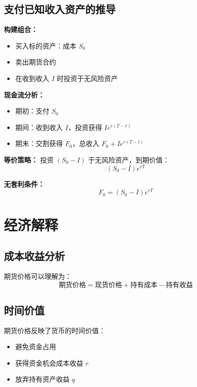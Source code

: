 \subsection{支付已知收入资产的推导}

\textbf{构建组合：}
\begin{itemize}
\item 买入标的资产：成本 $S_0$
\item 卖出期货合约
\item 在收到收入 $I$ 时投资于无风险资产
\end{itemize}

\textbf{现金流分析：}
\begin{itemize}
\item 期初：支付 $S_0$
\item 期间：收到收入 $I$，投资获得 $Ie^{r(T-t)}$
\item 期末：交割获得 $F_0$，总收入 $F_0 + Ie^{r(T-t)}$
\end{itemize}

\textbf{等价策略：}
投资 $(S_0 - I)$ 于无风险资产，到期价值：
\begin{equation}
(S_0 - I)e^{rT}
\end{equation}

\textbf{无套利条件：}
\begin{equation}
F_0 = (S_0 - I)e^{rT}
\end{equation}

\section{经济解释}

\subsection{成本收益分析}
期货价格可以理解为：
\begin{equation}
\text{期货价格} = \text{现货价格} + \text{持有成本} - \text{持有收益}
\end{equation}

\subsection{时间价值}
期货价格反映了货币的时间价值：
\begin{itemize}
\item 避免资金占用
\item 获得资金机会成本收益 $r$
\item 放弃持有资产收益 $q$
\end{itemize}

